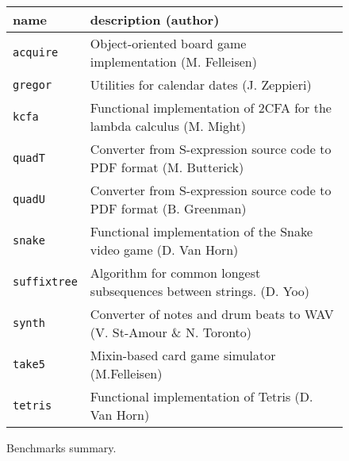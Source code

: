 \begin{figure}
\begin{tabular}{p{1.75cm} | p{6cm} }
  {\bf  name} & {\bf description (author)}  \\

\hline
  \texttt{acquire} & Object-oriented board game implementation (M. Felleisen)  \\%

\hline
  \texttt{gregor} & Utilities for calendar dates (J. Zeppieri) \\%

\hline
  \texttt{kcfa} & Functional implementation of 2CFA for the lambda calculus (M. Might) \\%

\hline
  \texttt{quadT} & Converter from S-expression source code to PDF format (M. Butterick)\\%

\hline
  \texttt{quadU} & Converter from S-expression source code to PDF format  (B. Greenman) \\%

\hline
  \texttt{snake} & Functional implementation of the  Snake video game (D. Van Horn) \\%

\hline
  \texttt{suffixtree} & Algorithm for common longest subsequences between strings. (D. Yoo) \\%

\hline
  \texttt{synth} & Converter of notes and drum beats to WAV (V. St-Amour \& N. Toronto) \\%

\hline
  \texttt{take5} & Mixin-based card game simulator (M.Felleisen)  \\%

\hline
  \texttt{tetris} & Functional implementation of Tetris (D. Van Horn) \\%

\end{tabular}
  \caption{Benchmarks summary.}
  \label{table:benchmark-descriptions}
\end{figure}

